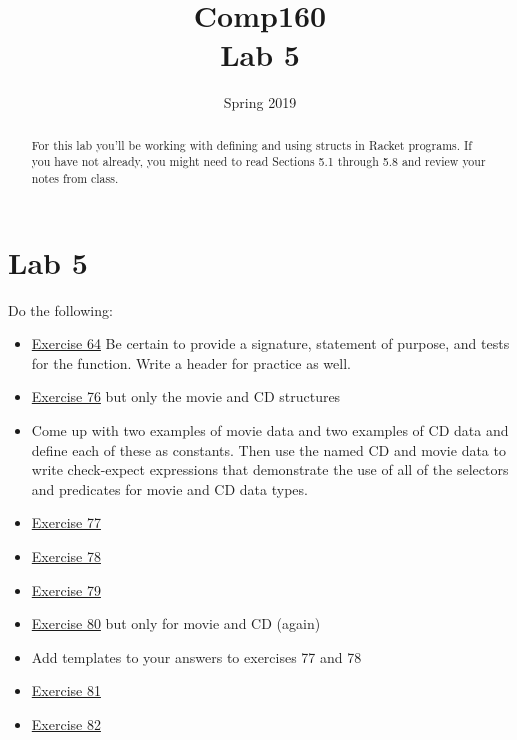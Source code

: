 \documentclass[nobib]{tufte-handout}
\title{Comp160 \\ Lab 5 }
\author{}
\date{ Spring 2019 }
\begin{document}
\maketitle

\begin{abstract}
For this lab you'll be working with defining and using structs in Racket programs.  If you have not already, you might need to read Sections 5.1 through 5.8 and review your notes from class.
\end{abstract}

\section*{Lab 5}

Do the following:
\begin{itemize}
  \item \href{https://htdp.org/2018-01-06/Book/part_one.html#%28counter._%28exercise._struct2%29%29}{Exercise 64} Be certain to provide a signature, statement of purpose, and tests for the function.  Write a header for practice as well.
  \item \href{https://htdp.org/2018-01-06/Book/part_one.html#%28counter._data-uni._%28exercise._struct7%29%29}{Exercise 76} but only the movie and CD structures
  \item Come up with two examples of movie data and two examples of CD data and define each of these as constants. Then use the named CD and movie data to write check-expect expressions that demonstrate the use of all of the selectors and predicates for movie and CD data types.
  \item \href{https://htdp.org/2018-01-06/Book/part_one.html#%28counter._data-uni._%28exercise._ex~3atime-structure%29%29}{Exercise 77}
  \item \href{https://htdp.org/2018-01-06/Book/part_one.html#%28counter._data-uni._%28exercise._struct9%29%29}{Exercise 78}
  \item \href{https://htdp.org/2018-01-06/Book/part_one.html#%28counter._data-uni._%28exercise._struct10%29%29}{Exercise 79}
  \item \href{https://htdp.org/2018-01-06/Book/part_one.html#%28counter._%28exercise._struct11%29%29}{Exercise 80} but only for movie and CD (again)
  \item Add templates to your answers to exercises 77 and 78
  \item \href{https://htdp.org/2018-01-06/Book/part_one.html#%28counter._%28exercise._struct11a%29%29}{Exercise 81}
  \item \href{https://htdp.org/2018-01-06/Book/part_one.html#%28counter._%28exercise._struct11b%29%29}{Exercise 82}
\end{itemize}
\end{document}

